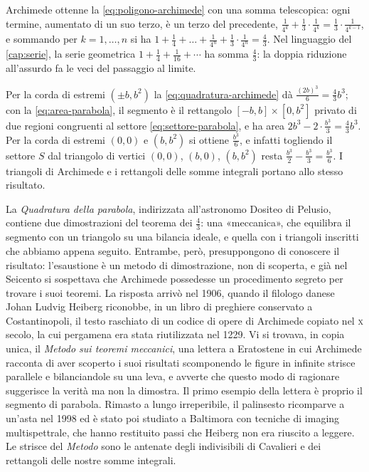 \begin{osservazione}
\label{oss:somma-archimede}
Archimede ottenne la \eqref{eq:poligono-archimede} con una somma telescopica: ogni
termine, aumentato di un suo terzo, è un terzo del precedente,
$\frac1{4^{k}}+\frac13\cdot\frac1{4^{k}}=\frac13\cdot\frac1{4^{k-1}}$, e sommando per
$k=1,\dots,n$ si ha $1+\frac14+\dots+\frac1{4^{n}}+\frac13\cdot\frac1{4^{n}}=\frac43$.
Nel linguaggio del \cref{cap:serie}, la serie geometrica $1+\frac14+\frac1{16}+\cdots$
ha somma $\frac43$: la doppia riduzione all'assurdo fa le veci del passaggio al limite.
\end{osservazione}

\begin{esempio}\label{es:archimede-settore}
Per la corda di estremi $(\pm b,b^{2})$ la \eqref{eq:quadratura-archimede} dà
$\frac{(2b)^{3}}6=\frac43b^{3}$; con la \eqref{eq:area-parabola}, il segmento è il
rettangolo $[-b,b]\times[0,b^{2}]$ privato di due regioni congruenti al settore
\eqref{eq:settore-parabola}, e ha area $2b^{3}-2\cdot\frac{b^{3}}3=\frac43b^{3}$. Per la
corda di estremi $(0,0)$ e $(b,b^{2})$ si ottiene $\frac{b^{3}}6$, e infatti togliendo
il settore $S$ dal triangolo di vertici $(0,0)$, $(b,0)$, $(b,b^{2})$ resta
$\frac{b^{3}}2-\frac{b^{3}}3=\frac{b^{3}}6$. I triangoli di Archimede e i rettangoli
delle somme integrali portano allo stesso risultato.
\end{esempio}

\begin{notastorica}
La \emph{Quadratura della parabola}, indirizzata all'astronomo Dositeo di Pelusio,
contiene due dimostrazioni del teorema dei $\frac43$: una «meccanica», che equilibra il
segmento con un triangolo su una bilancia ideale, e quella con i triangoli inscritti che
abbiamo appena seguito. Entrambe, però, presuppongono di conoscere il risultato:
l'esaustione è un metodo di dimostrazione, non di scoperta, e già nel Seicento si
sospettava che Archimede possedesse un procedimento segreto per trovare i suoi teoremi.
La risposta arrivò nel 1906, quando il filologo danese Johan Ludvig Heiberg riconobbe, in
un libro di preghiere conservato a Costantinopoli, il testo raschiato di un codice di
opere di Archimede copiato nel \textsc{x} secolo, la cui pergamena era stata riutilizzata
nel 1229. Vi si trovava, in copia unica, il \emph{Metodo sui teoremi meccanici}, una
lettera a Eratostene in cui Archimede racconta di aver scoperto i suoi risultati
scomponendo le figure in infinite strisce parallele e bilanciandole su una leva, e
avverte che questo modo di ragionare suggerisce la verità ma non la dimostra. Il primo
esempio della lettera è proprio il segmento di parabola. Rimasto a lungo irreperibile,
il palinsesto ricomparve a un'asta nel 1998 ed è stato poi studiato a Baltimora con
tecniche di imaging multispettrale, che hanno restituito passi che Heiberg non era
riuscito a leggere. Le strisce del \emph{Metodo} sono le antenate degli indivisibili di
Cavalieri e dei rettangoli delle nostre somme integrali.
\end{notastorica}
